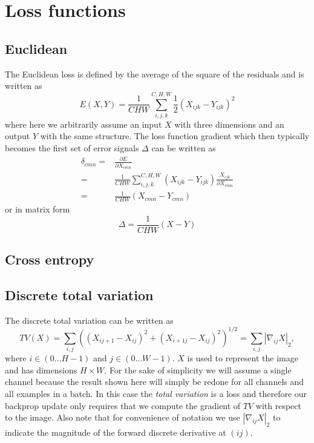 \documentclass[a4paper]{article}
\begin{document}
\newpage
\section{Loss functions}
\subsection{Euclidean}
The Euclidean loss is defined by the average of the square of the residuals and is written as
\begin{equation}
E(X,Y) = \frac{1}{CHW}\sum_{i,j,k}^{C,H,W} \frac{1}{2}\left (  X_{ijk} - Y_{ijk}\right )^2
\end{equation}
where here we arbitrarily assume an input $X$ with three dimensions and an output $Y$ with the same structure. 
The loss function gradient which then typically becomes the first set of error signals $\Delta$ can be written as
\begin{align}
\delta_{cmn} 
= &\frac{\partial E}{\partial X_{cmn}} \\
= &\frac{1}{CHW}\sum_{i,j,k}^{C,H,W} \left (  X_{ijk} - Y_{ijk}\right ) \frac{X_{ijk}}{\partial X_{cmn}} \\
= &\frac{1}{CHW}\left (  X_{cmn} - Y_{cmn}\right )
\end{align}
or in matrix form
\begin{equation}
\Delta = \frac{1}{CHW}\left (  X - Y\right )
\end{equation}
\subsection{Cross entropy}
\subsection{Discrete total variation}

The discrete total variation can be written as 
\begin{equation}
TV(X)= \sum_{i,j} \left ( \left ( X_{ij+1}-X_{ij}\right )^2 + \left ( X_{i+1j}-X_{ij}\right )^2 \right )^{1/2}= \sum_{i,j} \left | \nabla_{ij} X \right |_2 ,
\end{equation}
where $i \in (0\dots H-1)$ and $j \in (0\dots W-1)$. $X$ is used to represent the image and has dimensions $H \times W$. For the sake of simplicity we will assume a single channel because the result shown here will simply be redone for all channels and all examples in a batch. In this case the {\it total variation} is a loss and therefore our backprop update only requires that we compute the gradient of $TV$ with respect to the image. Also note that for convenience of notation we use $\left | \nabla_{ij} X \right |_2$ to indicate the magnitude of the forward discrete derivative at $(ij)$.
\end{document}
